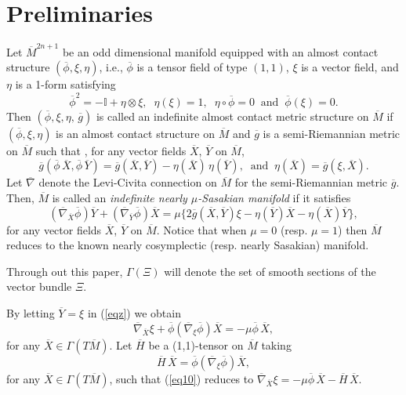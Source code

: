 \documentclass[reqno, 12pt]{amsart}
\numberwithin{equation}{section}
\begin{document}
\section{Preliminaries}\label{prel}
 
Let $\overline{M}^{2n+1}$ be an odd dimensional manifold equipped with an almost contact structure $(\overline{\phi}, \xi, \eta)$, i.e., $\overline{\phi}$ is a tensor field of type $(1, 1)$, $\xi$ is a vector field, and $\eta$ is a 1-form satisfying
\begin{equation}\label{equa1}
\overline{\phi}^{2} = -\mathbb{I} + \eta \otimes\xi,\;\;\eta(\xi)= 1 ,\;\;\eta\circ\overline{\phi} =
0 \;\;\mbox{and}\;\;\overline{\phi}(\xi) = 0.
\end{equation}
Then $(\overline{\phi}, \xi, \eta,\,\overline{g})$ is called an indefinite almost contact metric structure on $\overline{M}$ if $(\overline{\phi}, \xi, \eta)$ is an almost contact structure on $\overline{M}$ and $\overline{g}$ is a semi-Riemannian metric on $\overline{M}$ such that \cite{bl2}, for any vector fields $\overline{X}$, $\overline{Y}$ on  $\overline{M}$,
\begin{equation}\label{equa2}
 \overline{g}(\overline{\phi}\,\overline{X}, \overline{\phi}\,\overline{Y}) = \overline{g}(\overline{X}, \overline{Y}) -  \eta(\overline{X})\,\eta(\overline{Y}),\;\;\mbox{and}\;\;\eta(\overline{X}) =  \overline{g}(\xi,\overline{X}).
\end{equation}
Let $\overline{\nabla}$ denote the Levi-Civita connection on $\overline{M}$ for the semi-Riemannian metric $\overline{g}$. Then, $\overline{M}$ is called an \textit{indefinite nearly $\mu$-Sasakian manifold} if it satisfies
\begin{equation}\label{eqz}
         (\overline{\nabla}_{\overline{X}} \overline{\phi})\overline{Y}+(\overline{\nabla}_{\overline{Y}} \overline{\phi})\overline{X}=\mu\{2\overline{g}(\overline{X}, \overline{Y})\xi-\eta(\overline{Y})\overline{X}-\eta(\overline{X})\overline{Y}\},
    \end{equation}
for any vector fields $\overline{X}$, $\overline{Y}$ on $\overline{M}$.  Notice that when $\mu=0$ (resp. $\mu=1$) then $\overline{M}$ reduces to the known nearly cosymplectic (resp. nearly Sasakian) manifold.

Through out this paper, $\Gamma(\Xi)$ will denote the set of smooth sections of the vector bundle $\Xi$. 

By letting  $\overline{Y}=\xi$ in (\ref{eqz}) we obtain
   \begin{equation}
    \overline{\nabla}_{\overline{X}} \xi+\overline{\phi}(\overline{\nabla}_\xi \overline{\phi})\overline{X} =-\mu\overline{\phi}\,\overline{X},\label{eq10}
   \end{equation}
for any $\overline{X}\in \Gamma (T\overline{M})$. Let $\overline{H}$ be a (1,1)-tensor  on $\overline{M}$ taking
\begin{equation*}
 \overline{H}\,\overline{X}=\overline{\phi}(\overline{\nabla}_\xi \overline{\phi})\overline{X}, 
\end{equation*}
for any $\overline{X}\in \Gamma (T\overline{M})$, such that (\ref{eq10}) reduces to 
$
    \overline{\nabla}_{\overline{X}} \xi =-\mu\overline{\phi}\, \overline{X}-\overline{H}\,\overline{X}.
$
\end{document}

